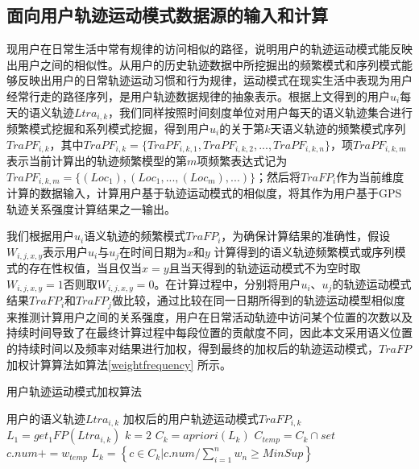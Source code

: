 \subsection{面向用户轨迹运动模式数据源的输入和计算}
现用户在日常生活中常有规律的访问相似的路径，说明用户的轨迹运动模式能反映出用户之间的相似性。从用户的历史轨迹数据中所挖掘出的频繁模式和序列模式能够反映出用户的日常轨迹运动习惯和行为规律，运动模式在现实生活中表现为用户经常行走的路径序列，是用户轨迹数据规律的抽象表示。根据上文得到的用户$u_{i}$每天的语义轨迹$Ltra_{i,k}$，我们同样按照时间刻度单位对用户每天的语义轨迹集合进行频繁模式挖掘和系列模式挖掘，得到用户$u_{i}$的关于第$k$天语义轨迹的频繁模式序列$TraPF_{i,k}$，其中$TraPF_{i,k}=\{ TraPF_{i,k,1},TraPF_{i,k,2},...,TraPF_{i,k,n} \}$，项$TraPF_{i,k,m}$表示当前计算出的轨迹频繁模型的第$m$项频繁表达式记为$TraPF_{i,k,m}=\{  (Loc_{1}),(Loc_{1},...,(Loc_{m}),...)  \}$；然后将$TraFP_{i}$作为当前维度计算的数据输入，计算用户基于轨迹运动模式的相似度，将其作为用户基于GPS轨迹关系强度计算结果之一输出。
\par 我们根据用户$u_{i}$语义轨迹的频繁模式$TraFP_{i}$，为确保计算结果的准确性，假设$W_{i,j,x,y}$表示用户$u_{i}$与$u_{j}$在时间日期为$x$和$y$ 计算得到的语义轨迹频繁模式或序列模式的存在性权值，当且仅当$x=y$且当天得到的轨迹运动模式不为空时取$W_{i,j,x,y}=1$否则取$W_{i,j,x,y}=0$。在计算过程中，分别将用户$u_{i}$、$u_{j}$的轨迹运动模式结果$TraFP_{i}$和$TraFP_{j}$做比较，通过比较在同一日期所得到的轨迹运动模型相似度来推测计算用户之间的关系强度，用户在日常活动轨迹中访问某个位置的次数以及持续时间导致了在最终计算过程中每段位置的贡献度不同，因此本文采用语义位置的持续时间以及频率对结果进行加权，得到最终的加权后的轨迹运动模式，$TraFP$加权计算算法如算法\ref{weightfrequency} 所示。
\begin{algorithm}[H]
    \caption{用户轨迹运动模式加权算法}
    \label{weightfrequency}
    \begin{algorithmic}[1] %
    \REQUIRE 用户的语义轨迹$Ltra_{i,k}$
    \ENSURE 加权后的用户轨迹运动模式$TraFP_{i,k}$
    \STATE $L_{1}= get_{1}FP(Ltra_{i,k})$
    \STATE $k=2$
    \STATE $C_{k}=apriori(L_{k})$
    \STATE $C_{temp}=C_{k}\cap set$
    \STATE $c.num+=w_{temp}$
    \ENDFOR
    \ENDFOR	
    \STATE \mbox{{$L_{k} = \left \{   c\in C_{k}  |  c.num /\sum_{i=1}^{n}w_{n} \geq MinSup  \right \}$ }}
    \ENDWHILE
\end{algorithmic}
\end{algorithm}
